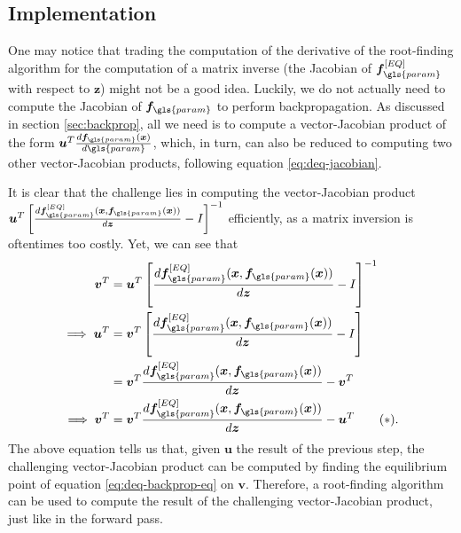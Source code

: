 \subsection{Implementation}

One may notice that trading the computation of the derivative of the root-finding algorithm for the computation of a matrix inverse (the Jacobian of $\bm{f}_{\gls{param}}^{[EQ]}$ with respect to $\bm{z}$) might not be a good idea.
Luckily, we do not actually need to compute the Jacobian of $\bm{f}_{\gls{param}}$ to perform backpropagation.
As discussed in section \ref{sec:backprop}, all we need is to compute a vector-Jacobian product of the form $\bm{u}^T\frac{d \bm{f}_{\gls{param}}(\bm{x})}{d \gls{param}}$, which, in turn, can also be reduced to computing two other vector-Jacobian products, following equation \eqref{eq:deq-jacobian}.

It is clear that the challenge lies in computing the vector-Jacobian product $\bm{u}^T\left[ \frac{d \bm{f}_{\gls{param}}^{[EQ]}(\bm{x},\bm{f}_{\gls{param}}(\bm{x}))}{d \bm{z}} - I \right]^{-1}$ efficiently, as a matrix inversion is oftentimes too costly.
Yet, we can see that
\begin{align*}
    \bm{v}^T &= \bm{u}^T\left[ \frac{d \bm{f}_{\gls{param}}^{[EQ]}(\bm{x},\bm{f}_{\gls{param}}(\bm{x}))}{d \bm{z}} - I \right]^{-1} \\
    \implies \bm{u}^T &= \bm{v}^T\left[ \frac{d \bm{f}_{\gls{param}}^{[EQ]}(\bm{x},\bm{f}_{\gls{param}}(\bm{x}))}{d \bm{z}} - I \right] \\
		      &= \bm{v}^T \frac{d \bm{f}_{\gls{param}}^{[EQ]}(\bm{x},\bm{f}_{\gls{param}}(\bm{x}))}{d \bm{z}} - \bm{v}^T \\
    \implies \bm{v}^T &= \bm{v}^T \frac{d \bm{f}_{\gls{param}}^{[EQ]}(\bm{x},\bm{f}_{\gls{param}}(\bm{x}))}{d \bm{z}} - \bm{u}^T \tag{$*$}\label{eq:deq-backprop-eq}
.\end{align*}
The above equation tells us that, given $\bm{u}$ the result of the previous step, the challenging vector-Jacobian product can be computed by finding the equilibrium point of equation \eqref{eq:deq-backprop-eq} on $\bm{v}$.
Therefore, a root-finding algorithm can be used to compute the result of the challenging vector-Jacobian product, just like in the forward pass.

